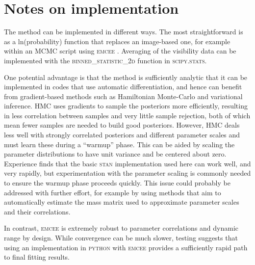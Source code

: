 \documentclass[fleqn,usenatbib]{mnras}
\begin{document}
\section{Notes on implementation}

The method can be implemented in different ways. The most straightforward is as a ln(probability) function that replaces an image-based one, for example within an MCMC script using \textsc{emcee} \citep{2013PASP..125..306F}. Averaging of the visibility data can be implemented with the \textsc{binned\_statistic\_2d} function in \textsc{scipy.stats}.

One potential advantage is that the method is sufficiently analytic that it can be implemented in codes that use automatic differentiation, and hence can benefit from gradient-based methods such as Hamiltonian Monte-Carlo \citep[HMC, e.g.][]{2017arXiv170102434B} and variational inference. HMC uses gradients to sample the posteriors more efficiently, resulting in less correlation between samples and very little sample rejection, both of which mean fewer samples are needed to build good posteriors. However, HMC deals less well with strongly correlated posteriors and different parameter scales and must learn these during a ``warmup'' phase. This can be aided by scaling the parameter distributions to have unit variance and be centered about zero. Experience finds that the basic \textsc{stan} implementation used here can work well, and very rapidly, but experimentation with the parameter scaling is commonly needed to ensure the warmup phase proceeds quickly. This issue could probably be addressed with further effort, for example by using methods that aim to automatically estimate the mass matrix used to approximate parameter scales and their correlations.

In contrast, \textsc{emcee} is extremely robust to parameter correlations and dynamic range by design. While convergence can be much slower, testing suggests that using an implementation in \textsc{python} with \textsc{emcee} provides a sufficiently rapid path to final fitting results.

\bsp	%
\label{lastpage}
\end{document}
